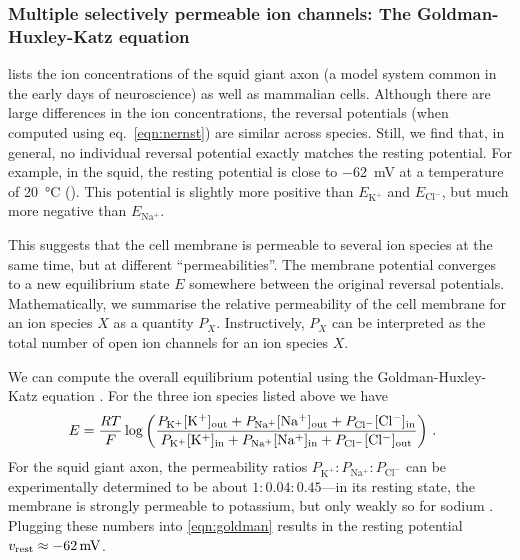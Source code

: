 \subsubsection{Multiple selectively permeable ion channels: The Goldman-Huxley-Katz equation}
 lists the ion concentrations of the squid giant axon (a model system common in the early days of neuroscience) as well as mammalian cells.
Although there are large differences in the ion concentrations, the reversal potentials (when computed using eq.~\ref{eqn:nernst}) are similar across species.
Still, we find that, in general, no individual reversal potential exactly matches the resting potential.
For example, in the squid, the resting potential is close to \SI{-62}{\milli\volt} at a temperature of \SI{20}{\degreeCelsius} (\cite{mccormick2014membrane}).
This potential is slightly more positive than $E_\mathrm{K^+}$ and $E_\mathrm{Cl^-}$, but much more negative than $E_\mathrm{Na^+}$.

This suggests that the cell membrane is permeable to several ion species at the same time, but at different \enquote{permeabilities}.
The membrane potential converges to a new equilibrium state $E$ somewhere between the original reversal potentials.
Mathematically, we summarise the relative permeability of the cell membrane for an ion species $X$ as a quantity $P_X$.
Instructively, $P_X$ can be interpreted as the total number of open ion channels for an ion species $X$.

We can compute the overall equilibrium potential using the Goldman-Huxley-Katz equation \citep{goldman1943potential,hodgkin1949effect}.
For the three ion species listed above we have
\begin{align}
	E &= \frac{RT}{F} \log \left( \frac{
		P_\mathrm{K^+} [\mathrm{K^+}]_\mathrm{out} +
		P_\mathrm{Na^+} [\mathrm{Na^+}]_\mathrm{out} +
		P_\mathrm{Cl^-} [\mathrm{Cl^-}]_\mathrm{in}}{
		P_\mathrm{K^+} [\mathrm{K^+}]_\mathrm{in} +
		P_\mathrm{Na^+} [\mathrm{Na^+}]_\mathrm{in} +
		P_\mathrm{Cl^-} [\mathrm{Cl^-}]_\mathrm{out}
		} \right) \,.
	\label{eqn:goldman}
\end{align}
For the squid giant axon, the permeability ratios $P_\mathrm{K^+} : P_\mathrm{Na^+} : P_\mathrm{Cl^-}$ can be experimentally determined to be about $1: 0.04 : 0.45$---in its resting state, the membrane is strongly permeable to potassium, but only weakly so for sodium \citep{mccormick2014membrane}.
Plugging these numbers into \cref{eqn:goldman} results in the resting potential $v_\mathrm{rest} \approx \SI{-62}{\milli\volt}$.

